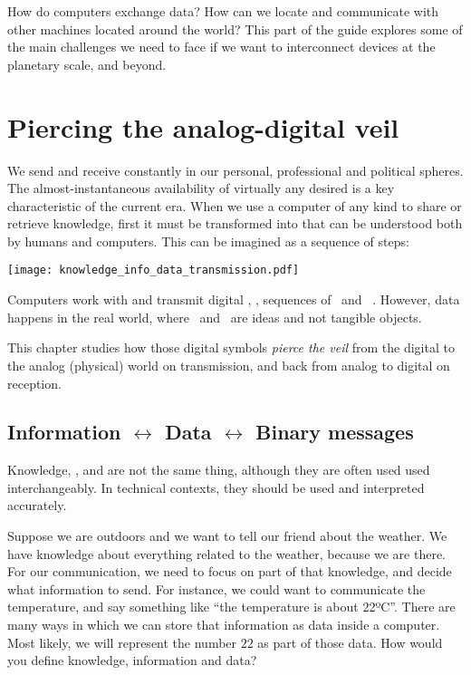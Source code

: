 How do computers exchange data? How can we locate and communicate with other machines located around the world?
This part of the guide explores some of the main challenges we need to face if we want to interconnect devices at the planetary scale, and beyond.


\chapter{Piercing the analog-digital veil}\label{sec:piercing}

We send and receive  constantly in our personal, professional and political spheres.
The almost-instantaneous availability of virtually any desired  is a key characteristic of the current era.
% 
When we use a computer of any kind to share or retrieve knowledge, first it must be transformed into  that can be understood both by humans and computers.
This can be imagined as a sequence of steps:
\begin{center}
\texttt{[image: knowledge\_info\_data\_transmission.pdf]}
\end{center}

Computers work with and transmit digital , \ie, sequences of 
\zero\ and \one\ . 
However, data  happens in the real world, where \zero\ and \one\ are ideas and not tangible objects.

This chapter studies how those digital symbols \textit{pierce the veil}  
from the digital to the analog (physical) world on transmission, and back from analog to digital on reception.


\section{Information $\leftrightarrow$ Data $\leftrightarrow$ Binary messages}\label{sec:piercing:information_binary}

Knowledge, , and  are not the same thing, 
although they are often used used interchangeably. In technical contexts, they should be used and interpreted accurately.
% 
\begin{exercise}
Suppose we are outdoors and we want to tell our friend about the weather.
% 
We have knowledge about everything related to the weather, because we are there.
For our communication, we need to focus on part of that knowledge, and decide what information to send.
For instance, we could want to communicate the temperature, and say something like ``the temperature is about 22ºC''.
% 
There are many ways in which we can store that information as data inside a computer. Most likely, we will represent the number 
$22$ as part of those data. How would you define knowledge, information and data?
\end{exercise}


